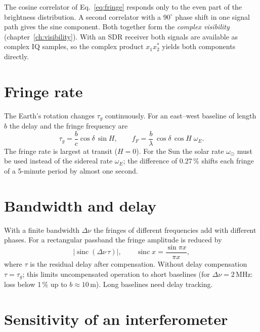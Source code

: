 The cosine correlator of Eq.~\eqref{eq:fringe} responds only to the
even part of the brightness distribution. A second correlator with a
$90^\circ$ phase shift in one signal path gives the sine component. Both
together form the \emph{complex visibility} (chapter~\ref{ch:visibility}).
With an SDR receiver both signals are available as complex IQ samples,
so the complex product $x_1 x_2^*$ yields both components directly.

\section{Fringe rate}

The Earth's rotation changes $\tau_g$ continuously. For an east--west
baseline of length $b$ the delay and the fringe frequency are
\begin{equation}
  \tau_g = \frac{b}{c}\cos\delta\,\sin H , \qquad
  f_F = \frac{b}{\lambda}\,\cos\delta\,\cos H\;\omega_E .
  \label{eq:fringerate}
\end{equation}
The fringe rate is largest at transit ($H=0$). For the Sun the solar
rate $\omega_\odot$ must be used instead of the sidereal rate
$\omega_E$; the difference of 0.27\,\% shifts each fringe of a
5-minute period by almost one second.

\section{Bandwidth and delay}

With a finite bandwidth $\Delta\nu$ the fringes of different
frequencies add with different phases. For a rectangular passband the
fringe amplitude is reduced by
\begin{equation}
  \left|\operatorname{sinc}(\Delta\nu\,\tau)\right|, \qquad
  \operatorname{sinc}x = \frac{\sin\pi x}{\pi x},
\end{equation}
where $\tau$ is the residual delay after compensation. Without delay
compensation $\tau = \tau_g$; this limits uncompensated operation to
short baselines (for $\Delta\nu = 2\,\mathrm{MHz}$: loss below 1\,\% up
to $b \approx 10\,\mathrm{m}$). Long baselines need delay tracking.

\section{Sensitivity of an interferometer}

